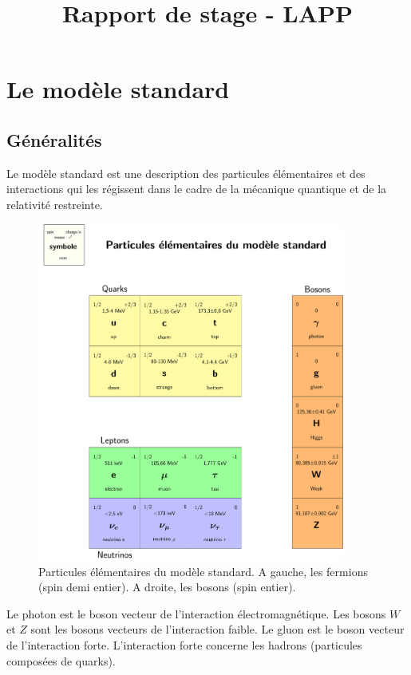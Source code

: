 \documentclass[11pt]{article} %
\title{Rapport de stage - LAPP}
\begin{document}
\maketitle

\section{Le modèle standard}

\subsection{Généralités}

Le modèle standard est une description des particules élémentaires et des interactions qui les régissent dans le cadre de la mécanique quantique et de la relativité restreinte. 


\begin{figure}[H]
\centering
  \caption{ Particules élémentaires du modèle standard. A gauche, les fermions (spin demi entier). A droite, les bosons (spin entier). }
\includegraphics[width=0.9\textwidth]{table_ms.pdf}

\end{figure}

Le photon est le boson vecteur de l'interaction électromagnétique. Les bosons $W$ et $Z$ sont les bosons vecteurs de l'interaction faible. Le gluon est le boson vecteur de l'interaction forte.
L'interaction forte concerne les hadrons (particules composées de quarks).
\end{document}
